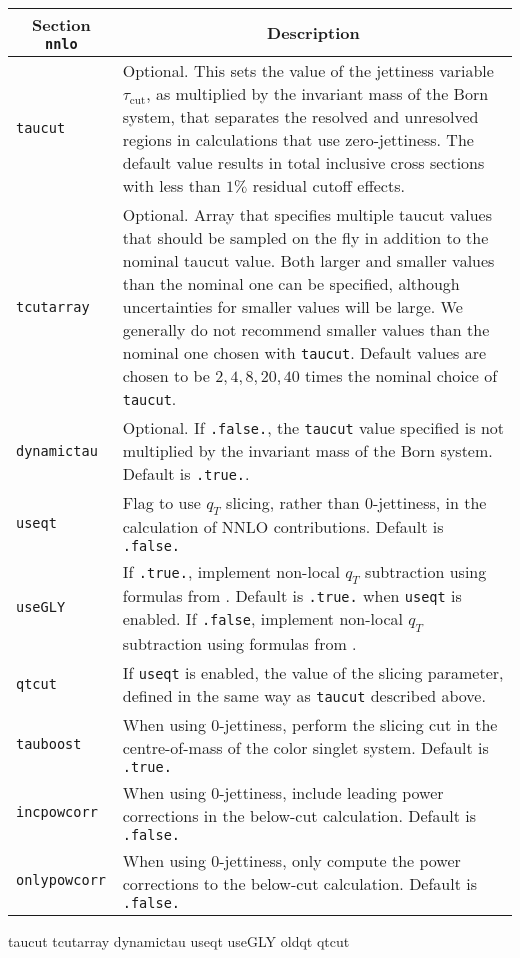 	\begin{longtable}{p{1.5cm}p{12cm}}
		\toprule
		\multicolumn{1}{c}{{\textbf{Section} \texttt{nnlo}}} & \multicolumn{1}{c}{{\textbf{Description}}} \\ 
		\midrule
		\texttt{taucut} & 
		Optional. This sets the value of the jettiness variable
		$\tau_\text{cut}$, as multiplied by the invariant mass of the Born system,
		that separates the resolved and unresolved regions in \NNLO{}
		calculations that use zero-jettiness. The default value results
		in total inclusive cross sections with less than $1\%$ residual cutoff effects. \\
		\texttt{tcutarray} &
		Optional. Array that specifies multiple taucut values that should be sampled
		on the fly in addition to the nominal taucut value. Both larger and smaller
		values than the nominal one can be specified, although uncertainties for
		smaller values will be large. We generally do not recommend smaller values
		than the nominal one chosen with \texttt{taucut}. Default values are chosen
		to be $2,4,8,20,40$ times the nominal choice of \texttt{taucut}.  \\
		\texttt{dynamictau} &
		Optional. If \texttt{.false.}, the \texttt{taucut} value specified
		is not multiplied by the invariant mass of the Born system. Default is \texttt{.true.}. \\
                \texttt{useqt} & Flag to use $q_T$ slicing, rather than
		0-jettiness, in the calculation of NNLO contributions.
		Default is \texttt{.false.} \\
                \texttt{useGLY} & If \texttt{.true.}, implement non-local $q_T$ subtraction using formulas from \cite{Gehrmann:2014yya}.
		Default is \texttt{.true.}  when \texttt{useqt} is enabled.  If \texttt{.false},
		implement non-local $q_T$ subtraction using formulas from \cite{Billis:2019vxg}. \\
                \texttt{qtcut} & If \texttt{useqt} is enabled, the value of the slicing parameter, defined
		in the same way as \texttt{taucut} described above.  \\
                \texttt{tauboost} & When using 0-jettiness, perform the slicing cut in the
		centre-of-mass of the color singlet system.  Default is \texttt{.true.} \\
                \texttt{incpowcorr} & When using 0-jettiness, include leading power corrections
		in the below-cut calculation. Default is \texttt{.false.} \\
                \texttt{onlypowcorr} & When using 0-jettiness, only compute the power corrections
		to the below-cut calculation. Default is \texttt{.false.} \\
		\bottomrule
	\end{longtable}


taucut
tcutarray
dynamictau
useqt
useGLY
oldqt
qtcut
   
